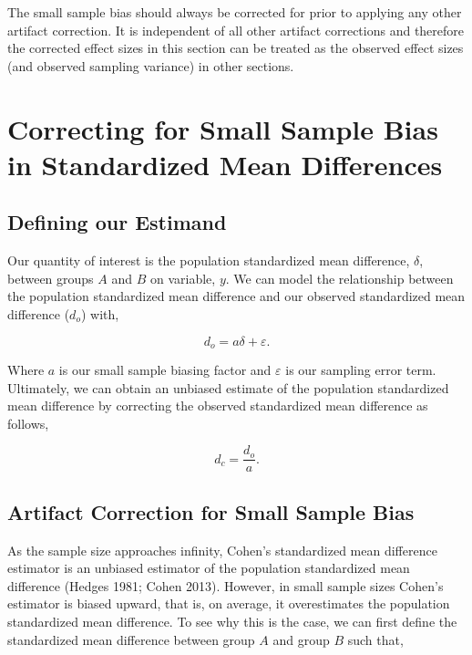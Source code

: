 \documentclass[
  letterpaper,
  DIV=11,
  numbers=noendperiod]{scrreprt}
\begin{document}
The small sample bias should always be corrected for prior to applying
any other artifact correction. It is independent of all other artifact
corrections and therefore the corrected effect sizes in this section can
be treated as the observed effect sizes (and observed sampling variance)
in other sections.

\hypertarget{correcting-for-small-sample-bias-in-standardized-mean-differences}{%
\section{Correcting for Small Sample Bias in Standardized Mean
Differences}\label{correcting-for-small-sample-bias-in-standardized-mean-differences}}

\hypertarget{defining-our-estimand}{%
\subsection{Defining our Estimand}\label{defining-our-estimand}}

Our quantity of interest is the population standardized mean difference,
\(\delta\), between groups \(A\) and \(B\) on variable, \(y\). We can
model the relationship between the population standardized mean
difference and our observed standardized mean difference (\(d_o\)) with,

\[
d_o = a\delta+\varepsilon.
\]

Where \(a\) is our small sample biasing factor and \(\varepsilon\) is
our sampling error term. Ultimately, we can obtain an unbiased estimate
of the population standardized mean difference by correcting the
observed standardized mean difference as follows,

\[
d_c = \frac{d_o}{a}.
\]

\hypertarget{artifact-correction-for-small-sample-bias}{%
\subsection{Artifact Correction for Small Sample
Bias}\label{artifact-correction-for-small-sample-bias}}

As the sample size approaches infinity, Cohen's standardized mean
difference estimator is an unbiased estimator of the population
standardized mean difference (Hedges 1981; Cohen 2013). However, in
small sample sizes Cohen's estimator is biased upward, that is, on
average, it overestimates the population standardized mean difference.
To see why this is the case, we can first define the standardized mean
difference between group \(A\) and group \(B\) such that,
\end{document}
